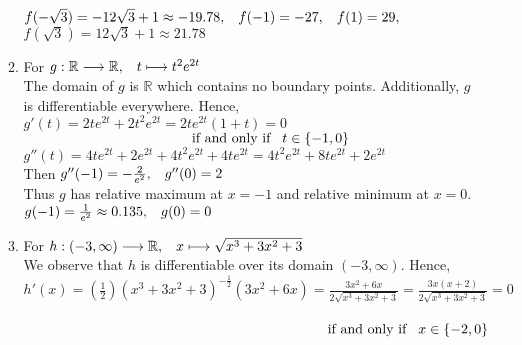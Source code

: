 \documentclass[12pt]{amsart}
\begin{document}
\begin{enumerate}
\begin{enumerate}
				$f(-\sqrt{3})=-12\sqrt{3}+1 \approx -19.78, \hspace{0.3cm} f(-1)=-27, \hspace{0.3cm} 
				f(1)=29,$ \\
				$f(\sqrt{3})=12\sqrt{3}+1 \approx 21.78$ \\
															
			\item For $g: \mathbb{R} \longrightarrow \mathbb{R}, \hspace{0.3cm} t\longmapsto t^2e^{2t}$\\
			
				The domain of $g$ is $\mathbb{R}$ which contains no boundary points. Additionally, 
				$g$ is differentiable everywhere. Hence,\\
				
				$g'(t) = 2te^{2t}+2t^2e^{2t} = 2te^{2t}(1+t)=0$ \\
				$\text{ } \hspace{4.1cm} \text{if and only if} \hspace{0.3cm} t \in \{-1,0\}$ \\
				
				$g''(t) = 4te^{2t}+2e^{2t}+4t^2e^{2t}+4te^{2t} = 4t^2e^{2t}+8te^{2t}+2e^{2t}$ \\
				
				Then $g''(-1)=-\frac{2}{e^2}, \hspace{0.3cm} g''(0)=2 $ \\
				
				Thus $g$ has relative maximum at $x=-1$ and relative minimum at $x=0$. \\
				
				$g(-1) = \frac{1}{e^2} \approx 0.135, \hspace{0.3cm} g(0) = 0$ \\
				
			\item For $h: (-3,\infty) \longrightarrow \mathbb{R}, \hspace{0.3cm} x \longmapsto 							\sqrt{x^3+3x^2+3}$ \\
			
				We observe that $h$ is differentiable over its domain $(-3,\infty)$. Hence,\\
				
				$h'(x) = \left(\frac{1}{2}\right)(x^3+3x^2+3)^{-\frac{1}{2}}(3x^2+6x) =
				\frac{3x^2+6x}{2\sqrt{x^3+3x^2+3}} = \frac{3x(x+2)}{2\sqrt{x^3+3x^2+3}} = 0$
				\\
				\\
				$\text{ } \hspace{7.5cm} \text{if and only if} \hspace{0.3cm} x \in \{-2,0\}$ \\
				

\end{enumerate}
\end{enumerate}
\end{document}
